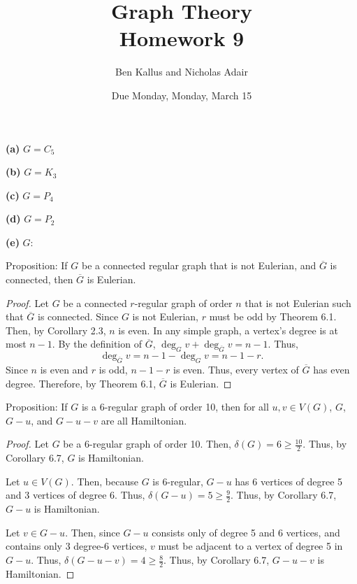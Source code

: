 \documentclass[12pt]{article}
\title{Graph Theory \\ Homework 9}
\author{Ben Kallus and Nicholas Adair}
\date{Due Monday, Monday, March 15}
\begin{document}
\maketitle


{\bf (a)} $G = C_5$

{\bf (b)} $G = K_3$

{\bf (c)} $G = P_4$

{\bf (d)} $G = P_2$

{\bf (e)} $G:$

\newpage{} Proposition: If $G$ be a connected regular graph that is not Eulerian, and $\overline{G}$ is connected, then $\overline{G}$ is Eulerian.
\begin{proof}
	Let $G$ be a connected $r$-regular graph of order $n$ that is not Eulerian such that $\overline G$ is connected.
	Since $G$ is not Eulerian, $r$ must be odd by Theorem 6.1.
	Then, by Corollary 2.3, $n$ is even.
	In any simple graph, a vertex's degree is at most $n - 1$.
	By the definition of $\overline G$, $\deg_G v + \deg_{\overline{G}} v = n - 1$.
	Thus, $$\deg_{\overline{G}} v = n - 1 - \deg_G v = n - 1 - r.$$
	Since $n$ is even and $r$ is odd, $n - 1 - r$ is even.
	Thus, every vertex of $\overline{G}$ has even degree.
	Therefore, by Theorem 6.1, $\overline{G}$ is Eulerian.
\end{proof}


\newpage{} Proposition: If $G$ is a 6-regular graph of order 10, then for all $u,v \in V(G)$, $G$, $G - u$, and $G - u - v$ are all Hamiltonian.
\begin{proof}
	Let $G$ be a 6-regular graph of order 10.
	Then, $\delta(G) = 6 \geq \frac{10}2$.
	Thus, by Corollary 6.7, $G$ is Hamiltonian.

	Let $u \in V(G)$.
	Then, because $G$ is 6-regular, $G-u$ has 6 vertices of degree 5 and 3 vertices of degree 6.
	Thus, $\delta(G-u) = 5 \geq \frac{9}2$.
	Thus, by Corollary 6.7, $G-u$ is Hamiltonian.

	Let $v \in G-u$.
	Then, since $G-u$ consists only of degree 5 and 6 vertices, and contains only 3 degree-6 vertices, $v$ must be adjacent to a vertex of degree 5 in $G-u$.
	Thus, $\delta(G - u - v) = 4 \geq \frac{8}{2}$.
	Thus, by Corollary 6.7, $G-u-v$ is Hamiltonian.
\end{proof}
\end{document}
